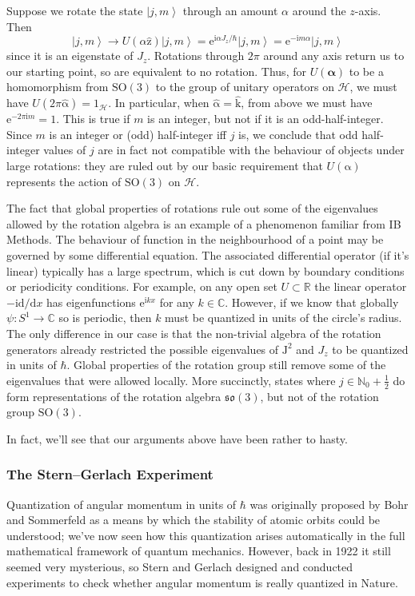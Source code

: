 \documentclass{article}
\theoremstyle{plain}\theoremheaderfont{\normalfont\itshape}\theorembodyfont{\rmfamily}\theoremseparator{.}\newtheorem*{rem}{Remark}\newtheorem*{ex}{Example}\newtheorem*{proof}{Proof}\newtheorem*{altp}{Alternative proof}
\theoremstyle{plain}\theoremheaderfont{\normalfont\bfseries}\theorembodyfont{\rmfamily}\theoremseparator{.}\newtheorem{thm}{Theorem}[section]\newtheorem{lem}[thm]{Lemma}\newtheorem{prop}[thm]{Proposition}\newtheorem*{cor}{Corollary}\newtheorem{defn}[thm]{Definition}\newtheorem{clm}[thm]{Claim}\newtheorem{clminproof}{Claim}
\theoremstyle{break}\theoremheaderfont{\normalfont\itshape}\theorembodyfont{\rmfamily}\theoremseparator{.\medskip}\newtheorem*{proofskip}{Proof}\newtheorem*{exs}{Examples}\newtheorem*{rems}{Remarks}
\theoremstyle{break}\theoremheaderfont{\normalfont\bfseries}\theorembodyfont{\rmfamily}\theoremseparator{.\medskip}\newtheorem{lemskip}[thm]{Lemma}\newtheorem{defnskip}[thm]{Definition}\newtheorem{propskip}[thm]{Proposition}\newtheorem{thmskip}[thm]{Theorem}
\numberwithin{equation}{section}
\newcommand{\ii}{\mathrm{i}}
\newcommand{\ee}{\mathrm{e}}
\newcommand{\ket}[1]{\left| #1 \right\rangle}
\newcommand{\vb}[1]{\bm{\mathrm{#1}}}
\newcommand{\vu}[1]{\hat{\bm{\mathrm{#1}}}}
\newcommand{\hb}{\mathcal{H}}
\newcommand{\NN}{\mathbb{N}}
\newcommand{\RR}{\mathbb{R}}
\newcommand{\CC}{\mathbb{C}}
\newcommand{\SO}{\mathrm{SO}}
\begin{document}
    Suppose we rotate the state \(\ket{j,m}\) through an amount \(\alpha\) around the \(z\)-axis. Then 
    \begin{equation}
        \ket{j,m}\longrightarrow U(\alpha\vu{z})\ket{j,m}=\ee^{\ii \alpha J_z/\hbar}\ket{j,m}=\ee^{-\ii m\alpha}\ket{j,m}
    \end{equation}
    since it is an eigenstate of \(J_z\). Rotations through \(2\pi\) around any axis return us to our starting point, so are equivalent to no rotation. Thus, for \(U(\bm{\alpha})\) to be a homomorphism from \(\SO(3)\) to the group of unitary operators on \(\hb\), we must have \(U(2\pi\vu{\alpha})=1_{\hb}\). In particular, when \(\vu{\alpha}=\vu{k}\), from above we must have \(\ee^{-2\pi \ii m}=1\). This is true if \(m\) is an integer, but not if it is an odd-half-integer. Since \(m\) is an integer or (odd) half-integer iff \(j\) is, we conclude that odd half-integer values of \(j\) are in fact not compatible with the behaviour of objects under large rotations: they are ruled out by our basic requirement that \(U(\vb{\alpha})\) represents the action of \(\SO(3)\) on \(\hb\).

    The fact that global properties of rotations rule out some of the eigenvalues allowed by the rotation algebra is an example of a phenomenon familiar from IB Methods. The behaviour of function in the neighbourhood of a point may be governed by some differential equation. The associated differential operator (if it's linear) typically has a large spectrum, which is cut down by boundary conditions or periodicity conditions. For example, on any open set \(U\subset\RR\) the linear operator \(-\ii\mathrm{d}/\mathrm{d}x\) has eigenfunctions \(\ee^{\ii kx}\) for any \(k\in\CC\). However, if we know that globally \(\psi:S^1\to\CC\) so is periodic, then \(k\) must be quantized in units of the circle's radius. The only difference in our case is that the non-trivial algebra of the rotation generators already restricted the possible eigenvalues of \(\vb{J}^2\) and \(J_z\) to be quantized in units of \(\hbar\). Global properties of the rotation group still remove some of the eigenvalues that were allowed locally. More succinctly, states where \(j\in\NN_0+\frac{1}{2}\) do form representations of the rotation algebra \(\mathfrak{so}(3)\), but not of the rotation group \(\SO(3)\).

    In fact, we'll see that our arguments above have been rather to hasty.

    \subsubsection{The Stern--Gerlach Experiment}\label{Chap:Stern_Gerlach}
    Quantization of angular momentum in units of \(\hbar\) was originally proposed by Bohr and Sommerfeld as a means by which the stability of atomic orbits could be understood; we've now seen how this quantization arises automatically in the full mathematical framework of quantum mechanics. However, back in 1922 it still seemed very mysterious, so Stern and Gerlach designed and conducted experiments to check whether angular momentum is really quantized in Nature.
\end{document}
